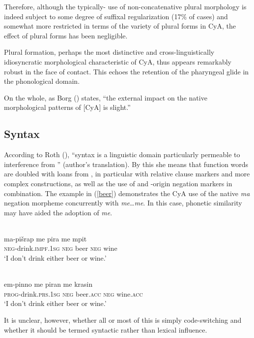 \documentclass[output=paper]{langsci/langscibook}
\begin{document}
Therefore, although the typically- use of {non-concatenative} plural morphology is indeed subject to some degree of suffixal regularization (17\% of cases) and somewhat more restricted in terms of the variety of plural forms in CyA, the effect of  plural forms has been negligible.

Plural {formation}, perhaps the most distinctive and cross-linguistically idiosyncratic morphological characteristic of CyA, thus appears remarkably robust in the face of contact. This echoes the retention of the {pharyngeal} glide in the phonological domain.

On the whole, as Borg (\citeyear[57]{Borg1994}) states, “the external impact on the native morphological patterns of [CyA] is slight.”

\subsection{Syntax}

According to Roth (\citeyear[70]{Roth2004}), “syntax is a linguistic domain particularly permeable to interference from ” (author’s translation). By this she means that function words are doubled with loans from , in particular with {relative} clause markers and more complex constructions, as well as the use of  and -origin {negation} markers in combination. The example in (\ref{beer}) demonstrates the CyA use of the native \textit{ma} {negation} morpheme concurrently with  \textit{me}…\textit{me}. In this case, phonetic similarity may have aided the adoption of \textit{me}.\largerpage

\ea\label{beer}
 {\citealt[149]{Borg1985}}\\
\gll ma-pišrap me pira me mpit\\
    \textsc{neg}-drink.\textsc{impf.1sg} \textsc{neg} beer \textsc{neg} wine  \\
\glt ‘I don’t drink either beer or wine.’

\ex
{}\\
\gll em-pinno me piran me krasin\\
    \textsc{prog}-drink.\textsc{prs.1sg} \textsc{neg}  beer.\textsc{acc} \textsc{neg} wine.\textsc{acc} \\
\glt ‘I don’t drink either beer or wine.’
\z
\z

It is unclear, however, whether all or most of this is simply {code-switching} and whether it should be termed syntactic rather than lexical influence.
\end{document}
